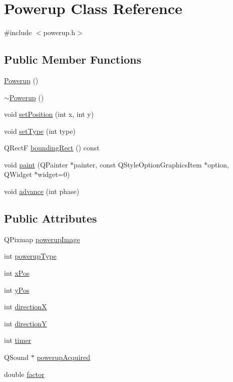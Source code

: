 \hypertarget{class_powerup}{
\section{Powerup Class Reference}
\label{class_powerup}
}


{\ttfamily \#include $<$powerup.h$>$}\subsection*{Public Member Functions}
\begin{DoxyCompactItemize}
\item 
\hyperlink{class_powerup_a20c3efe6b86d6f358a57f8215d157b20}{Powerup} ()
\item 
\hyperlink{class_powerup_a2e1c97859d671527885e6f4eb200ca3f}{$\sim$Powerup} ()
\item 
void \hyperlink{class_powerup_a2a2f3e03678ec74cfcd0e255508da424}{setPosition} (int x, int y)
\item 
void \hyperlink{class_powerup_a61e9a00b5146933a34dec31eeab2bd64}{setType} (int type)
\item 
QRectF \hyperlink{class_powerup_aab0164a05e29dd7acad0be68d85d8658}{boundingRect} () const 
\item 
void \hyperlink{class_powerup_af9b71984dff4762bd0d5316375a0db36}{paint} (QPainter $\ast$painter, const QStyleOptionGraphicsItem $\ast$option, QWidget $\ast$widget=0)
\item 
void \hyperlink{class_powerup_a02fc102081ea4cbbccdbb77f1c4fd00a}{advance} (int phase)
\end{DoxyCompactItemize}
\subsection*{Public Attributes}
\begin{DoxyCompactItemize}
\item 
QPixmap \hyperlink{class_powerup_aefad56fdb8d34e9ebda24ffcaff19364}{powerupImage}
\item 
int \hyperlink{class_powerup_abd54a06f5c3f0eccf117e3e66ac4eed6}{powerupType}
\item 
int \hyperlink{class_powerup_a504173661ebda0dad5527d8da3db112a}{xPos}
\item 
int \hyperlink{class_powerup_a5c5ead355eac87687262e9016f771309}{yPos}
\item 
int \hyperlink{class_powerup_a5fb53c57a23b61e7d59696eadb9fe7db}{directionX}
\item 
int \hyperlink{class_powerup_a2169993d2e076f75b3c236bebc71ab4f}{directionY}
\item 
int \hyperlink{class_powerup_a0c32c5cedef96b3fd45c4d9474e1379c}{timer}
\item 
QSound $\ast$ \hyperlink{class_powerup_ab5346fff1db496ccf866d51aa30b34fa}{powerupAcquired}
\item 
double \hyperlink{class_powerup_a6a5cf33586c92ef4fbd950f108d36ed9}{factor}
\end{DoxyCompactItemize}


